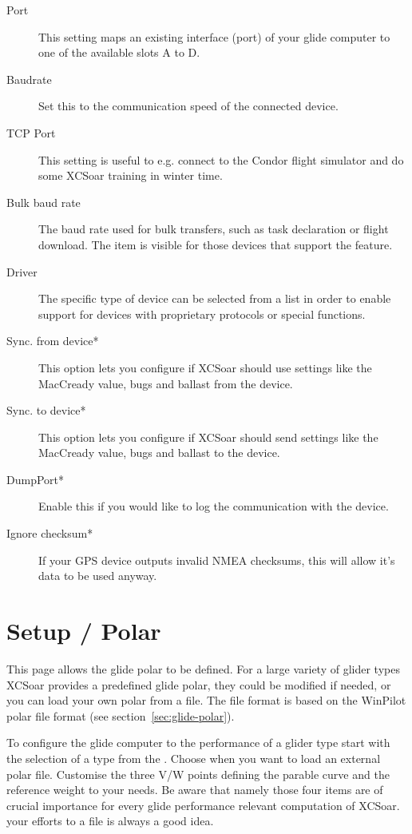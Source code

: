 \begin{description}
\item[Port]  This setting maps an existing interface (port) of your 
  glide computer to one of the available slots A to D.
\item[Baudrate]  Set this to the communication speed of the connected device.
\item[TCP Port]  This setting is useful to e.g. connect to the Condor flight
  simulator and do some XCSoar training in winter time.
\item[Bulk baud rate]  The baud rate used for bulk transfers, such 
  as task declaration or flight download. The item is visible for those 
  devices that support the feature.
\item[Driver]  The specific type of device can be selected from a list in order
  to enable support for devices with proprietary protocols or special
  functions.
\item[Sync. from device*]  This option lets you configure if XCSoar should use settings 
  like the MacCready value, bugs and ballast from the device.
\item[Sync. to device*]  This option lets you configure if XCSoar should send settings 
  like the MacCready value, bugs and ballast to the device.
\item[DumpPort*]  Enable this if you would like to log the communication with the device.
\item[Ignore checksum*] If your GPS device outputs invalid NMEA checksums, this 
  will allow it's data to be used anyway.
\end{description}


\section{Setup / Polar}

This page allows the glide polar to be defined. For a large variety of glider types 
XCSoar provides a predefined glide polar, they could be modified if needed, or 
you can load your own polar from a file. 
The file format is based on the WinPilot polar file format (see section~\ref{sec:glide-polar}).

\label{conf:polar} To configure the glide computer to the performance of a glider 
type start with the selection of a type from the . 
Choose  when you want to load an external polar file.
Customise the three V/W points defining the parable curve and the reference 
weight to your needs. 
\tip Be aware that namely those four items are of crucial importance 
for every glide performance relevant computation of XCSoar.   
 your efforts to a file is always a good idea.

